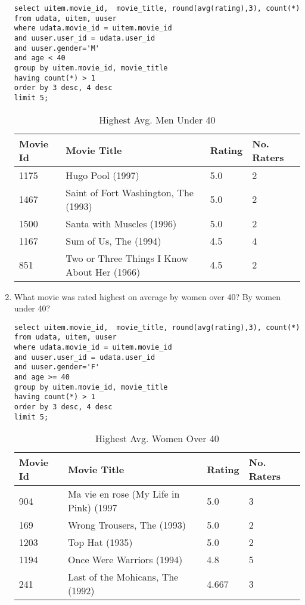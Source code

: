 \documentclass[letterpaper,11pt]{report}
\begin{document}
\begin{savenotes}
\begin{enumerate}
\begin{verbatim}
select uitem.movie_id,  movie_title, round(avg(rating),3), count(*) 
from udata, uitem, uuser 
where udata.movie_id = uitem.movie_id 
and uuser.user_id = udata.user_id 
and uuser.gender='M' 
and age < 40 
group by uitem.movie_id, movie_title 
having count(*) > 1 
order by 3 desc, 4 desc 
limit 5;
\end{verbatim}

\begin{table}[htbp]
\centering
    \begin{tabular}{|l|l|l|l|}
    \hline
    Movie Id & Movie Title                                 & Rating & No. Raters \\ \hline
    1175     & Hugo Pool (1997)                            & 5.0    & 2          \\ \hline
    1467     & Saint of Fort Washington, The (1993)        & 5.0    & 2          \\ \hline
    1500     & Santa with Muscles (1996)                   & 5.0    & 2          \\ \hline
    1167     & Sum of Us, The (1994)                       & 4.5    & 4          \\ \hline
    851      & Two or Three Things I Know About Her (1966) & 4.5    & 2          \\ \hline
    \end{tabular}
    \caption {Highest Avg. Men Under 40}
\end{table}
\item What movie was rated highest on average by women over 40? By women under 40?
\begin{verbatim}
select uitem.movie_id,  movie_title, round(avg(rating),3), count(*) 
from udata, uitem, uuser 
where udata.movie_id = uitem.movie_id 
and uuser.user_id = udata.user_id 
and uuser.gender='F' 
and age >= 40 
group by uitem.movie_id, movie_title 
having count(*) > 1 
order by 3 desc, 4 desc 
limit 5;
\end{verbatim}


\begin{table}[htbp]
\centering
    \begin{tabular}{|l|l|l|l|}
    \hline
    Movie Id & Movie Title                            & Rating & No. Raters \\ \hline
    904      & Ma vie en rose (My Life in Pink) (1997 & 5.0    & 3          \\ \hline
    169      & Wrong Trousers, The (1993)             & 5.0    & 2          \\ \hline
    1203     & Top Hat (1935)                         & 5.0    & 2          \\ \hline
    1194     & Once Were Warriors (1994)              & 4.8    & 5          \\ \hline
    241      & Last of the Mohicans, The (1992)       & 4.667  & 3          \\ \hline
    \end{tabular}
    \caption {Highest Avg. Women Over 40}
\end{table}


\end{enumerate}
\end{savenotes}
\end{document}
